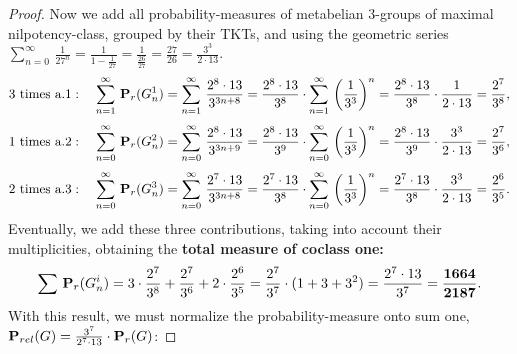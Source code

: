 \documentclass[10pt,a4paper]{amsart}
\begin{document}
\begin{proof}
\noindent
Now we add all probability-measures
of metabelian \(3\)-groups of maximal nilpotency-class,
grouped by their TKTs,
and using the geometric series
\(\sum_{n=0}^{\infty}\,\frac{1}{27^n}
=\frac{1}{1-\frac{1}{27}}
=\frac{1}{\frac{26}{27}}
=\frac{27}{26}
=\frac{3^3}{2\cdot 13}\).
\begin{equation}
\label{eqn:a1}
3 \text{ times a.1}: \quad
\sum_{n=1}^{\infty}\,{\bf P}_r(G_n^1)=
\sum_{n=1}^{\infty}\,\frac{2^8\cdot 13}{3^{3n+8}}=
\frac{2^8\cdot 13}{3^{8}}\cdot\sum_{n=1}^{\infty}\,\left(\frac{1}{3^3}\right)^n=
\frac{2^8\cdot 13}{3^{8}}\cdot\frac{1}{2\cdot 13}=
\frac{2^7}{3^8},
\end{equation}
\begin{equation}
\label{eqn:a2}
1 \text{ times a.2}: \quad
\sum_{n=0}^{\infty}\,{\bf P}_r(G_n^2)=
\sum_{n=0}^{\infty}\,\frac{2^8\cdot 13}{3^{3n+9}}=
\frac{2^8\cdot 13}{3^{9}}\cdot\sum_{n=0}^{\infty}\,\left(\frac{1}{3^3}\right)^n=
\frac{2^8\cdot 13}{3^{9}}\cdot\frac{3^3}{2\cdot 13}=
\frac{2^7}{3^6},
\end{equation}
\begin{equation}
\label{eqn:a3}
2 \text{ times a.3}: \quad
\sum_{n=0}^{\infty}\,{\bf P}_r(G_n^3)=
\sum_{n=0}^{\infty}\,\frac{2^7\cdot 13}{3^{3n+8}}=
\frac{2^7\cdot 13}{3^{8}}\cdot\sum_{n=0}^{\infty}\,\left(\frac{1}{3^3}\right)^n=
\frac{2^7\cdot 13}{3^{8}}\cdot\frac{3^3}{2\cdot 13}=
\frac{2^6}{3^5}.
\end{equation}
Eventually, we add these three contributions,
taking into account their multiplicities, obtaining the 
\textbf{total measure of coclass one:}
\begin{equation}
\label{eqn:cc1}
\sum\,{\bf P}_{r}(G_n^i)=
3\cdot\frac{2^7}{3^8}+\frac{2^7}{3^6}+2\cdot\frac{2^6}{3^5}=
\frac{2^7}{3^7}\cdot(1+3+3^2)=
\frac{2^7\cdot 13}{3^7}=
\frac{\bf 1664}{\bf 2187}.
\end{equation}
With this result, we must normalize the probability-measure onto sum one, \({\bf P}_{rel}(G)=\frac{3^7}{2^7\cdot 13}\cdot{\bf P}_{r}(G)\):


\end{proof}
\end{document}
